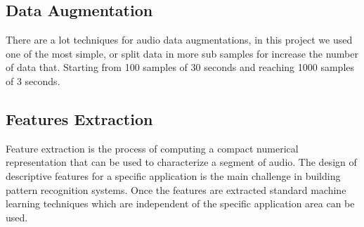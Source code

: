 \documentclass[conference]{IEEEtran}
\begin{document}
\subsection{Data Augmentation}
\noindent
There are a lot techniques for audio data augmentations, in this project we used one of the most simple, or split data in more sub samples for increase the number of data that. Starting from 100 samples of 30 seconds and reaching 1000 samples of 3 seconds.
\subsection{Features Extraction}
\noindent
Feature extraction is the process of computing a compact numerical representation that can be used to characterize a segment of audio. The design of descriptive features for a specific application is the main challenge in building pattern recognition systems. Once the features are extracted standard machine learning techniques which are independent of the specific application area can be used.\cite{1021072}
\end{document}
